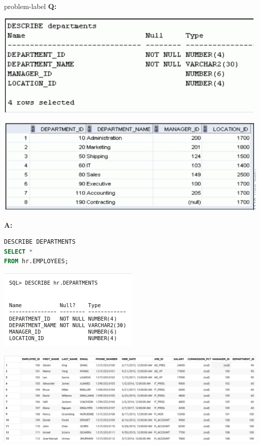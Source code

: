 \newpage
\begin{problem}{}{problem-label}
    \textbf{Q:} 
    
\begin{center}
  \includegraphics[scale=0.6]{images/c1q4.png}
\end{center}
\begin{center}
  \includegraphics[scale=0.5]{images/c1q4-2.png}
\end{center}

    \vspace{1em}
    \textbf{A:} 
    \begin{lstlisting}[language=SQL]
DESCRIBE DEPARTMENTS
SELECT *
FROM hr.EMPLOYEES;
\end{lstlisting}

\vspace{1em}
\begin{center}
  \includegraphics[scale=0.7]{images/c1a6-1.png}
\end{center}

\begin{center}
  \includegraphics[scale=0.4]{images/c1a6-2.png}
\end{center}

    
\end{problem}


